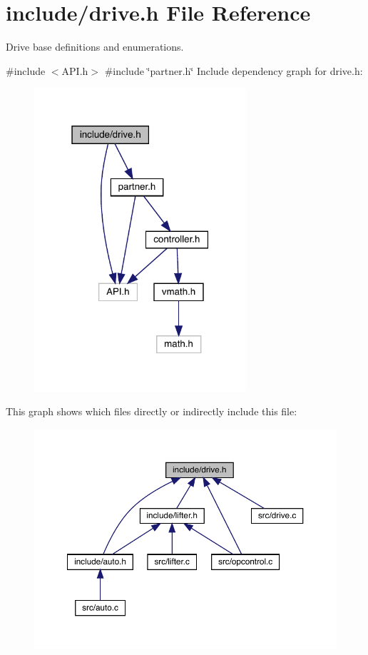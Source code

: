 \section{include/drive.h File Reference}
\label{drive_8h}


Drive base definitions and enumerations.  


{\ttfamily \#include $<$A\+P\+I.\+h$>$}\newline
{\ttfamily \#include \char`\"{}partner.\+h\char`\"{}}\newline
Include dependency graph for drive.\+h\+:\nopagebreak
\begin{figure}[H]
\begin{center}
\leavevmode
\includegraphics[width=223pt]{drive_8h__incl}
\end{center}
\end{figure}
This graph shows which files directly or indirectly include this file\+:\nopagebreak
\begin{figure}[H]
\begin{center}
\leavevmode
\includegraphics[width=350pt]{drive_8h__dep__incl}
\end{center}
\end{figure}
